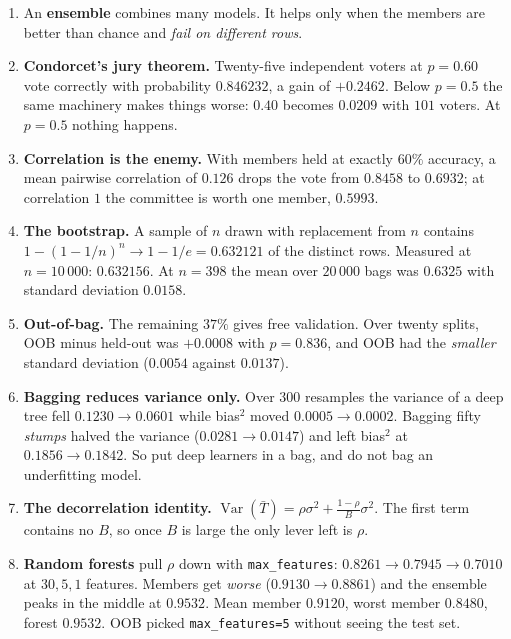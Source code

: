 \documentclass[11pt]{article}
\begin{document}
\begin{enumerate}[leftmargin=*]
  \item An \textbf{ensemble} combines many models. It helps only when the
    members are better than chance and \emph{fail on different rows}.
  \item \textbf{Condorcet's jury theorem.} Twenty-five independent voters at
    $p = 0.60$ vote correctly with probability $\mathbf{0.846232}$, a gain of
    $+0.2462$. Below $p = 0.5$ the same machinery makes things worse:
    $0.40$ becomes $0.0209$ with $101$ voters. At $p = 0.5$ nothing happens.
  \item \textbf{Correlation is the enemy.} With members held at exactly
    $60\%$ accuracy, a mean pairwise correlation of $0.126$ drops the vote
    from $0.8458$ to $\mathbf{0.6932}$; at correlation $1$ the committee is
    worth one member, $0.5993$.
  \item \textbf{The bootstrap.} A sample of $n$ drawn with replacement from
    $n$ contains $1 - (1 - 1/n)^n \to 1 - 1/e = \mathbf{0.632121}$ of the
    distinct rows. Measured at $n = 10\,000$: $0.632156$. At $n = 398$ the
    mean over $20\,000$ bags was $0.6325$ with standard deviation $0.0158$.
  \item \textbf{Out-of-bag.} The remaining $37\%$ gives free validation. Over
    twenty splits, OOB minus held-out was $\mathbf{+0.0008}$ with
    $p = 0.836$, and OOB had the \emph{smaller} standard deviation
    ($0.0054$ against $0.0137$).
  \item \textbf{Bagging reduces variance only.} Over $300$ resamples the
    variance of a deep tree fell $0.1230 \to \mathbf{0.0601}$ while bias$^2$
    moved $0.0005 \to 0.0002$. Bagging fifty \emph{stumps} halved the variance
    ($0.0281 \to 0.0147$) and left bias$^2$ at $0.1856 \to 0.1842$. So put
    deep learners in a bag, and do not bag an underfitting model.
  \item \textbf{The decorrelation identity.}
    $\operatorname{Var}(\bar T) = \rho\sigma^2 + \frac{1-\rho}{B}\sigma^2$.
    The first term contains no $B$, so once $B$ is large the only lever left
    is $\rho$.
  \item \textbf{Random forests} pull $\rho$ down with \texttt{max\_features}:
    $0.8261 \to 0.7945 \to 0.7010$ at $30, 5, 1$ features. Members get
    \emph{worse} ($0.9130 \to 0.8861$) and the ensemble peaks in the middle at
    $\mathbf{0.9532}$. Mean member $0.9120$, worst member $0.8480$, forest
    $0.9532$. OOB picked \texttt{max\_features=5} without seeing the test set.

\end{enumerate}
\end{document}
